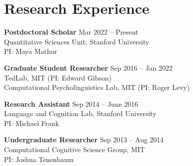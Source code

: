\documentclass[11pt,]{article}
\begin{document}
\hypertarget{research-experience}{%
\section{Research Experience}\label{research-experience}}

\textbf{Postdoctoral Scholar} \hfill Mar 2022 -- Present\\
\hspace*{0.333em}\hspace*{0.333em}\hspace*{0.333em}Quantitative Sciences
Unit, Stanford University\\
\hspace*{0.333em}\hspace*{0.333em}\hspace*{0.333em}PI: Maya Mathur

\textbf{Graduate Student Researcher} \hfill Sep 2016 -- Jan 2022\\
\hspace*{0.333em}\hspace*{0.333em}\hspace*{0.333em}TedLab, MIT (PI:
Edward Gibson)\\
\hspace*{0.333em}\hspace*{0.333em}\hspace*{0.333em}Computational
Psycholinguistics Lab, MIT (PI: Roger Levy)

\textbf{Research Assistant} \hfill Sep 2014 -- June 2016\\
\hspace*{0.333em}\hspace*{0.333em}\hspace*{0.333em}Language and
Cognition Lab, Stanford University\\
\hspace*{0.333em}\hspace*{0.333em}\hspace*{0.333em}PI: Michael Frank

\textbf{Undergraduate Researcher} \hfill Sep 2013 -- Aug 2014\\
\hspace*{0.333em}\hspace*{0.333em}\hspace*{0.333em}Computational
Cognitive Science Group, MIT\\
\hspace*{0.333em}\hspace*{0.333em}\hspace*{0.333em}PI: Joshua Tenenbaum
\end{document}
